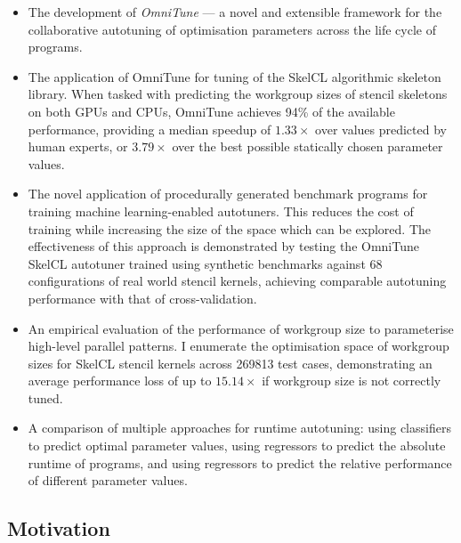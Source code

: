 \documentclass[nonatbib,preprint,9pt]{sigplanconf}
\begin{document}
\begin{itemize}
\item The development of \emph{OmniTune} --- a novel and extensible
  framework for the collaborative autotuning of optimisation
  parameters across the life cycle of programs.
\item The application of OmniTune for tuning of the SkelCL algorithmic
  skeleton library. When tasked with predicting the workgroup sizes of
  stencil skeletons on both GPUs and CPUs, OmniTune achieves 94\% of
  the available performance, providing a median speedup of
  $1.33\times$ over values predicted by human experts, or $3.79\times$
  over the best possible statically chosen parameter values.
\item The novel application of procedurally generated benchmark
  programs for training machine learning-enabled autotuners. This
  reduces the cost of training while increasing the size of the space
  which can be explored. The effectiveness of this approach is
  demonstrated by testing the OmniTune SkelCL autotuner trained using
  synthetic benchmarks against 68 configurations of real world stencil
  kernels, achieving comparable autotuning performance with that of
  cross-validation.
\item An empirical evaluation of the performance of workgroup size to
  parameterise high-level parallel patterns. I enumerate the
  optimisation space of workgroup sizes for SkelCL stencil kernels
  across 269813 test cases, demonstrating an average performance loss
  of up to $15.14\times$ if workgroup size is not correctly tuned.
\item A comparison of multiple approaches for runtime autotuning:
  using classifiers to predict optimal parameter values, using
  regressors to predict the absolute runtime of programs, and using
  regressors to predict the relative performance of different
  parameter values.
\end{itemize}


\subsection{Motivation}
\end{document}
